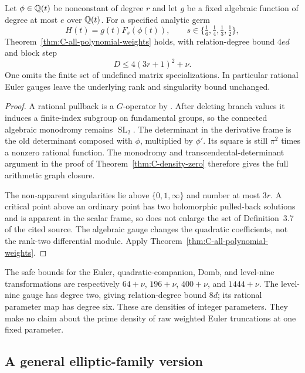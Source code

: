 \begin{corollary}
\label{cor:C-pullback-density}
Let $\phi\in\mathbb Q(t)$ be nonconstant of degree $r$ and let $g$ be a
fixed algebraic function of degree at most $e$ over $\mathbb Q(t)$. For a
specified analytic germ
\[
 H(t)=g(t)F_s(\phi(t)),
 \qquad s\in\{\tfrac16,\tfrac14,\tfrac13,\tfrac12\},
\]
Theorem~\ref{thm:C-all-polynomial-weights} holds, with relation-degree
bound $4ed$ and block step
\[
 D\le4(3r+1)^2+\nu.
\]
One omits the finite set of undefined matrix specializations.
In particular rational Euler gauges leave the underlying rank and
singularity bound unchanged.
\end{corollary}
\begin{proof}
A rational pullback is a $G$-operator by
\cite[Theorem~3.5(4)]{BaldiBinyaminiUrbanik2026}. After deleting branch
values it induces a finite-index subgroup on fundamental groups, so
the connected algebraic monodromy remains $\operatorname{SL}_2$.
The determinant in the derivative frame is the old determinant
composed with $\phi$, multiplied by $\phi'$. Its square is still
$\pi^2$ times a nonzero rational function. The monodromy and
transcendental-determinant argument in the proof of
Theorem~\ref{thm:C-density-zero} therefore gives the full arithmetic
graph closure.

The non-apparent singularities lie above $\{0,1,\infty\}$ and number
at most $3r$. A critical point above an ordinary point has two
holomorphic pulled-back solutions and is apparent in the scalar
frame, so does not enlarge the set of Definition~3.7 of the cited
source. The algebraic gauge changes the quadratic coefficients, not
the rank-two differential module. Apply
Theorem~\ref{thm:C-all-polynomial-weights}.
\end{proof}

The safe bounds for the Euler, quadratic-companion, Domb, and
level-nine transformations are respectively
$64+\nu$, $196+\nu$, $400+\nu$, and $1444+\nu$.
The level-nine gauge has degree two, giving relation-degree bound
$8d$; its rational parameter map has degree six.
These are densities of integer parameters. They make no claim about
the prime density of raw weighted Euler truncations at one fixed
parameter.

\subsection{A general elliptic-family version}
\label{sec:C-elliptic-density}

